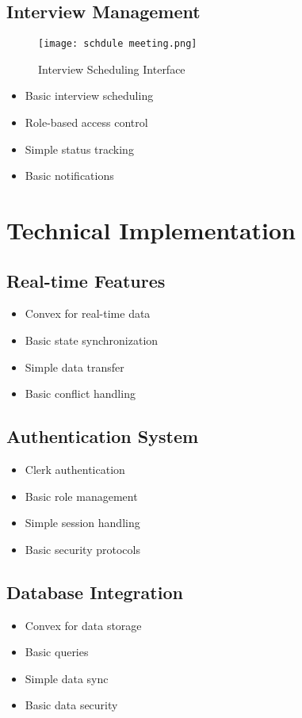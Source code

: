 \documentclass[12pt,a4paper]{report}
\begin{document}
\subsection{Interview Management}
\begin{figure}[h!]
    \centering
    \texttt{[image: schdule meeting.png]}
    \caption{Interview Scheduling Interface}
    \label{fig:schedule}
\end{figure}

\begin{itemize}
   \item Basic interview scheduling
   \item Role-based access control
   \item Simple status tracking
   \item Basic notifications
\end{itemize}

\section{Technical Implementation}

\subsection{Real-time Features}
\begin{itemize}
   \item Convex for real-time data
   \item Basic state synchronization
   \item Simple data transfer
   \item Basic conflict handling
\end{itemize}

\subsection{Authentication System}
\begin{itemize}
   \item Clerk authentication
   \item Basic role management
   \item Simple session handling
   \item Basic security protocols
\end{itemize}

\subsection{Database Integration}
\begin{itemize}
   \item Convex for data storage
   \item Basic queries
   \item Simple data sync
   \item Basic data security
\end{itemize}
\end{document}

